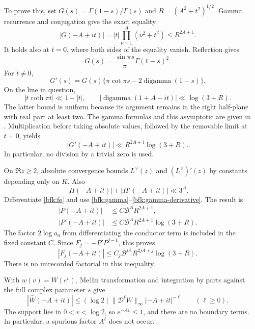 To prove this, set \(G(s)=\Gamma(1-s)/\Gamma(s)\) and
\(R=(A^2+t^2)^{1/2}\).  Gamma recurrence and conjugation give
the exact equality
\begin{equation}
 |G(-A+it)|=|t|\prod_{\nu=1}^{A}(\nu^2+t^2)
       \le R^{2A+1}.
 \label{bfk:gamma}
\end{equation}
It holds also at \(t=0\), where both sides of the equality vanish.
Reflection gives
\[
 G(s)=\frac{\sin\pi s}{\pi}\Gamma(1-s)^2.
\]
For \(t\ne0\),
\[
 G'(s)=G(s)\{\pi\cot\pi s-2\operatorname{digamma}(1-s)\}.
\]
On the line in question,
\[
 |t\coth\pi t|\ll1+|t|,\qquad
 |\operatorname{digamma}(1+A-it)|\ll\log(3+R).
\]
The latter bound is uniform because its argument remains in the
right half-plane with real part at least two.  The gamma formulas
and this asymptotic are given in \cite[\S\S5.5, 5.11]{BFKDLMF}.
Multiplication before taking absolute values, followed by the
removable limit at \(t=0\), yields
\begin{equation}
 |G'(-A+it)|\ll R^{2A+1}\log(3+R).
 \label{bfk:gamma-derivative}
\end{equation}
In particular, no division by a trivial zero is used.

On \(\Re z\ge2\), absolute convergence bounds \(L^\vee(z)\) and
\((L^\vee)'(z)\) by constants depending only on \(K\).
Also
\[
 |H(-A+it)|+|H'(-A+it)|\ll 3^A.
\]
Differentiate \eqref{bfk:fe} and use
\eqref{bfk:gamma}--\eqref{bfk:gamma-derivative}.
The result is
\begin{align*}
 |P(-A+it)|&\le C\mathcal B^A R^{2A+1},\\
 |P'(-A+it)|&\le C\mathcal B^A
                    R^{2A+1}\log(3+R).
\end{align*}
The factor \(2\log a_0\) from differentiating the conductor term
is included in the fixed constant \(C\).
Since \(F_j=-P'P^{j-1}\), this proves
\begin{equation}
 |F_j(-A+it)|\le C_j\mathcal B^{jA}
                     R^{2jA+j}\log(3+R).
 \label{bfk:power-bound}
\end{equation}
There is no unrecorded factorial in this inequality.

With \(w(v)=W(e^v)\), Mellin transformation and integration by
parts against the full complex parameter \(s\) give
\begin{equation}
 |\widehat W(-A+it)|
 \le(\log2)\|\mathcal D^\ell W\|_\infty
            |-A+it|^{-\ell}\qquad(\ell\ge0).
 \label{bfk:mellin}
\end{equation}
The support lies in \(0<v<\log2\), so \(e^{-Av}\le1\), and there
are no boundary terms.  In particular, a spurious factor
\(A^\ell\) does not occur.

